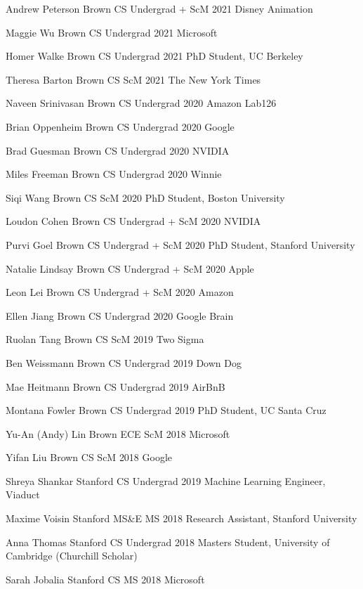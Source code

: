 \documentclass[line,margin]{res}
\begin{document}
\begin{resume}
\alumni
{Andrew Peterson}
{Brown CS Undergrad + ScM}
{2021}
{Disney Animation}

\alumni
{Maggie Wu}
{Brown CS Undergrad}
{2021}
{Microsoft}

\alumni
{Homer Walke}
{Brown CS Undergrad}
{2021}
{PhD Student, UC Berkeley}

\alumni
{Theresa Barton}
{Brown CS ScM}
{2021}
{The New York Times}

\alumni
{Naveen Srinivasan}
{Brown CS Undergrad}
{2020}
{Amazon Lab126}

\alumni
{Brian Oppenheim}
{Brown CS Undergrad}
{2020}
{Google}

\alumni
{Brad Guesman}
{Brown CS Undergrad}
{2020}
{NVIDIA}

\alumni
{Miles Freeman}
{Brown CS Undergrad}
{2020}
{Winnie}

\alumni
{Siqi Wang}
{Brown CS ScM}
{2020}
{PhD Student, Boston University}

\alumni
{Loudon Cohen}
{Brown CS Undergrad + ScM}
{2020}
{NVIDIA}

\alumni
{Purvi Goel}
{Brown CS Undergrad + ScM}
{2020}
{PhD Student, Stanford University}

\alumni
{Natalie Lindsay}
{Brown CS Undergrad + ScM}
{2020}
{Apple}

\alumni
{Leon Lei}
{Brown CS Undergrad + ScM}
{2020}
{Amazon}

\alumni
{Ellen Jiang}
{Brown CS Undergrad}
{2020}
{Google Brain}

\alumni
{Ruolan Tang}
{Brown CS ScM}
{2019}
{Two Sigma}

\alumni
{Ben Weissmann}
{Brown CS Undergrad}
{2019}
{Down Dog}

\alumni
{Mae Heitmann}
{Brown CS Undergrad}
{2019}
{AirBnB}

\alumni
{Montana Fowler}
{Brown CS Undergrad}
{2019}
{PhD Student, UC Santa Cruz}

\alumni
{Yu-An (Andy) Lin}
{Brown ECE ScM}
{2018}
{Microsoft}

\alumni
{Yifan Liu}
{Brown CS ScM}
{2018}
{Google}

\alumni
{Shreya Shankar}
{Stanford CS Undergrad}
{2019}
{Machine Learning Engineer, Viaduct}

\alumni
{Maxime Voisin}
{Stanford MS\&E MS}
{2018}
{Research Assistant, Stanford University}

\alumni
{Anna Thomas}
{Stanford CS Undergrad}
{2018}
{Masters Student, University of Cambridge (Churchill Scholar)}

\alumni
{Sarah Jobalia}
{Stanford CS MS}
{2018}
{Microsoft}


\end{resume}
\end{document}
